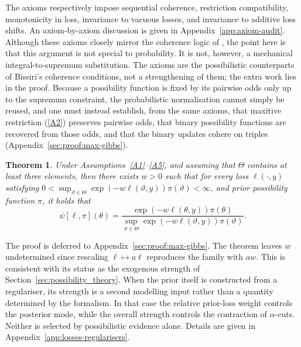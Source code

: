 \documentclass[accepted]{uai2026} %
\newtheorem{theorem}{Theorem}
\theoremstyle{remark}
\begin{document}
The axioms respectively impose sequential coherence, restriction compatibility,
monotonicity in loss, invariance to vacuous losses, and invariance to additive
loss shifts. An axiom-by-axiom discussion is given in Appendix~\ref{app:axiom-audit}. Although these axioms closely mirror the coherence logic of \citet{bissiri2016general}, the point here is that this argument is not special to probability. It is not, however, a mechanical integral-to-supremum substitution. The axioms are the possibilistic counterparts of Bissiri's coherence conditions, not a strengthening of them; the extra work lies in the proof. Because a possibility function is fixed by its pairwise odds only up to the supremum constraint, the probabilistic normalisation cannot simply be reused, and one must instead establish, from the same axioms, that maxitive restriction (\ref{A2}) preserves pairwise odds, that binary possibility functions are recovered from those odds, and that the binary updates cohere on triples (Appendix~\ref{sec:proof:max-gibbs}).


\begin{theorem}
\label{thm:max-gibbs}
Under Assumptions~\ref{A1}--\ref{A5}, and assuming that $\Theta$ contains at least three elements, then there exists $w > 0$ such that for every loss $\ell(\cdot,y)$ satisfying $0<\sup_{\vartheta\in\Theta}\exp(-w\ell(\vartheta,y))\pi(\vartheta)<\infty$, and prior possibility function $\pi$, it holds that
\[
\psi[\ell,\pi](\theta) =
\frac{\exp(-w \ell(\theta, y)) \pi(\theta)}
{\sup_{\vartheta \in \Theta} \exp(-w \ell(\vartheta, y)) \pi(\vartheta)}.
\]
\end{theorem}

The proof is deferred to Appendix~\ref{sec:proof:max-gibbs}. The theorem leaves $w$ undetermined since rescaling $\ell\mapsto a\ell$ reproduces the family with $aw$. This is consistent with its status as the exogenous strength of Section~\ref{sec:possibility_theory}. When the prior itself is constructed from a regulariser, its strength is a second modelling input rather than a quantity determined by the formalism. In that case the relative prior-loss weight controls the posterior mode, while the overall strength controls the contraction of $\alpha$-cuts. Neither is selected by possibilistic evidence alone. Details are given in Appendix~\ref{app:losses-regularisers}.
\end{document}
